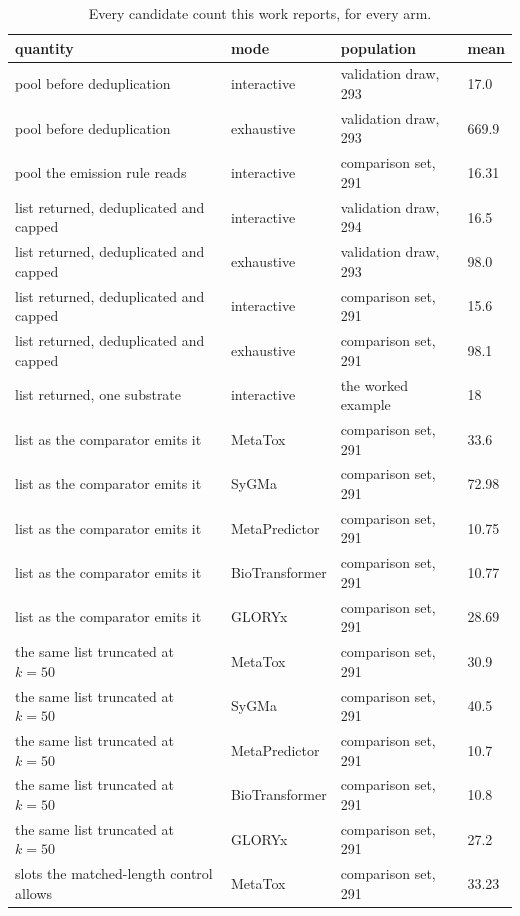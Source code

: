 \begin{table}[h]
\centering\small
\begin{threeparttable}
\caption{Every candidate count this work reports, for every arm.}
\label{tab:si-counts}
\begin{tabular}{llll}
\toprule
quantity & mode & population & mean \\
\midrule
pool before deduplication & interactive & validation draw, 293 & 17.0 \\
pool before deduplication & exhaustive & validation draw, 293 & 669.9 \\
pool the emission rule reads & interactive & comparison set, 291 & 16.31 \\
list returned, deduplicated and capped & interactive & validation draw, 294 & 16.5 \\
list returned, deduplicated and capped & exhaustive & validation draw, 293 & 98.0 \\
list returned, deduplicated and capped & interactive & comparison set, 291 & 15.6 \\
list returned, deduplicated and capped & exhaustive & comparison set, 291 & 98.1 \\
list returned, one substrate & interactive & the worked example & 18 \\
list as the comparator emits it & MetaTox & comparison set, 291 & 33.6 \\
list as the comparator emits it & SyGMa & comparison set, 291 & 72.98 \\
list as the comparator emits it & MetaPredictor & comparison set, 291 & 10.75 \\
list as the comparator emits it & BioTransformer & comparison set, 291 & 10.77 \\
list as the comparator emits it & GLORYx & comparison set, 291 & 28.69 \\
the same list truncated at $k=50$ & MetaTox & comparison set, 291 & 30.9 \\
the same list truncated at $k=50$ & SyGMa & comparison set, 291 & 40.5 \\
the same list truncated at $k=50$ & MetaPredictor & comparison set, 291 & 10.7 \\
the same list truncated at $k=50$ & BioTransformer & comparison set, 291 & 10.8 \\
the same list truncated at $k=50$ & GLORYx & comparison set, 291 & 27.2 \\
slots the matched-length control allows & MetaTox & comparison set, 291 & 33.23 \\

\end{tabular}
\end{threeparttable}
\end{table}
